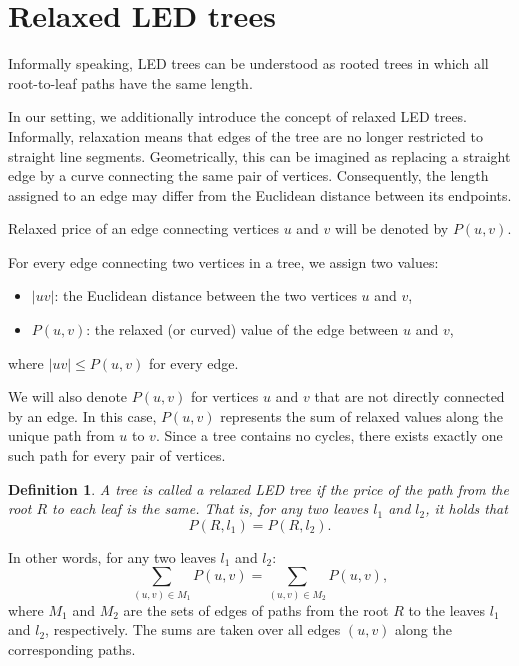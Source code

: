 \documentclass[openany]{book}
\newcommand{\Price}[2]{P(#1,#2)}
\newtheorem{definition}{Definition}
\begin{document}
	\section{Relaxed LED trees}	
	
	Informally speaking, LED trees can be understood as rooted trees in which all root-to-leaf paths have the same length.
	
	In our setting, we additionally introduce the concept of relaxed LED trees. Informally, relaxation means that edges of the tree are no longer restricted to straight line segments. Geometrically, this can be imagined as replacing a straight edge by a curve connecting the same pair of vertices. Consequently, the length assigned to an edge may differ from the Euclidean distance between its endpoints.
	
	Relaxed price of an edge connecting vertices \(u\) and \(v\) will be denoted by \(\Price{u}{v}.\)

	
	For every edge connecting two vertices in a tree, we assign two values:
	\begin{itemize}
		\item \( |uv| \): the Euclidean distance between the two vertices \( u \) and \( v \),
		\item \( \Price{u}{v} \): the relaxed (or curved) value of the edge between \( u \) and \( v \),
	\end{itemize}
	where \( |uv| \leq \Price{u}{v} \) for every edge.
	
	We will also denote \( \Price{u}{v} \) for vertices \( u \) and \( v \) that are not directly connected by an edge. In this case, \( \Price{u}{v} \) represents the sum of relaxed values along the unique path from \( u \) to \( v \). Since a tree contains no cycles, there exists exactly one such path for every pair of vertices.
	
	\begin{definition}\label{def:led}
		A tree is called a relaxed LED tree if the price of the path from the root \( R \) to each leaf is the same. That is, for any two leaves \( l_1 \) and \( l_2 \), it holds that
		\[
		\Price{R}{l_1} = \Price{R}{l_2}.
		\]
	\end{definition}
	
	In other words, for any two leaves \( l_1 \) and \( l_2 \):
	\[
	\sum_{(u,v) \in M_1} \Price{u}{v} = \sum_{(u,v) \in M_2} \Price{u}{v},
	\]
	where \( M_1 \) and \( M_2 \) are the sets of edges of paths from the root \( R \) to the leaves \( l_1 \) and \( l_2 \), respectively. The sums are taken over all edges \( (u,v) \) along the corresponding paths.
	
\end{document}
